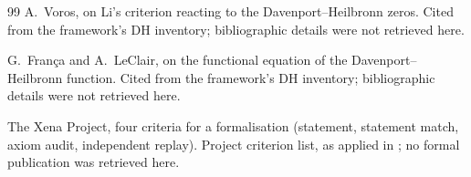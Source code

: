 \documentclass[11pt,a4paper]{article}
\begin{document}
\begin{thebibliography}{99}
 A.~Voros, on Li's criterion reacting to the Davenport--Heilbronn zeros.
  Cited from the framework's DH inventory; bibliographic details were not retrieved here.

 G.~Fran\c{c}a and A.~LeClair, on the functional equation of the
  Davenport--Heilbronn function. Cited from the framework's DH inventory; bibliographic details were
  not retrieved here.

 The Xena Project, four criteria for a formalisation (statement, statement
  match, axiom audit, independent replay). Project criterion list, as applied in \cite{leanmathlib};
  no formal publication was retrieved here.

\end{thebibliography}
\end{document}
